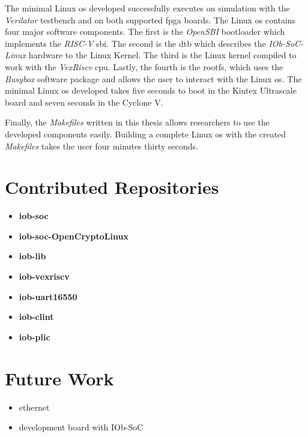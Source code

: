 The minimal Linux \acrshort{os} developed successfully executes on simulation with the \textit{Verilator} testbench and on both supported \acrshort{fpga} boards. The Linux \acrshort{os} contains four major software components. The first is the \textit{OpenSBI} bootloader which implements the \textit{RISC-V} \acrshort{sbi}. The second is the \acrlong{dtb} which describes the \textit{IOb-SoC-Linux} hardware to the Linux Kernel. The third is the Linux kernel compiled to work with the \textit{VexRiscv} \acrshort{cpu}. Lastly, the fourth is the \acrlong{rootfs}, which uses the \textit{Busybox} software package and allows the user to interact with the Linux \acrshort{os}. The minimal Linux \acrshort{os} developed takes five seconds to boot in the Kintex Ultrascale board and seven seconds in the Cyclone V.

Finally, the \textit{Makefiles} written in this thesis allows researchers to use the developed components easily. Building a complete Linux \acrshort{os} with the created \textit{Makefiles} takes the user four minutes thirty seconds.

\section{Contributed Repositories}
\label{section:contributions}
\begin{itemize}
    \item \textbf{iob-soc}
    \item \textbf{iob-soc-OpenCryptoLinux}
    \item \textbf{iob-lib}
    \item \textbf{iob-vexriscv}
    \item \textbf{iob-uart16550}
    \item \textbf{iob-clint}
    \item \textbf{iob-plic}
\end{itemize}

\section{Future Work}
\label{section:future}
\begin{itemize}
    \item ethernet
    \item development board with IOb-SoC
\end{itemize}
